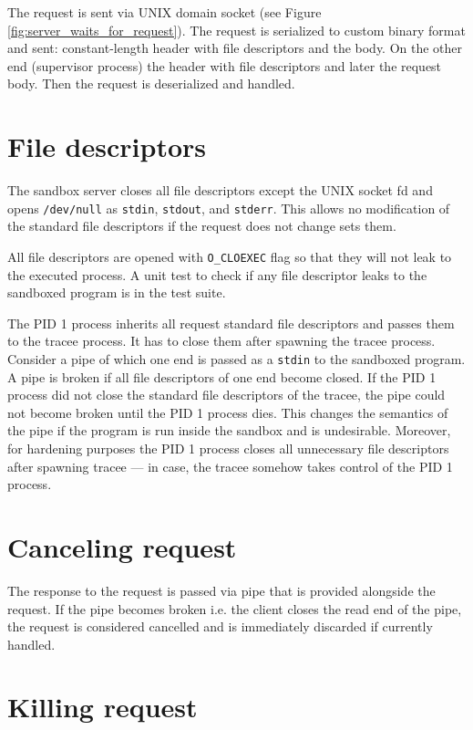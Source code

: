 \documentclass[en]{pracamgr}
\begin{document}
The request is sent via UNIX domain socket (see Figure \ref{fig:server_waits_for_request}). The request is serialized to custom binary format and sent: constant-length header with file descriptors and the body. On the other end (supervisor process) the header with file descriptors and later the request body. Then the request is deserialized and handled.

\section{File descriptors}

The sandbox server closes all file descriptors except the UNIX socket fd and opens \texttt{/dev/null} as \texttt{stdin}, \texttt{stdout}, and \texttt{stderr}. This allows no modification of the standard file descriptors if the request does not change sets them.

All file descriptors are opened with \texttt{O\_CLOEXEC} flag so that they will not leak to the executed process. A unit test to check if any file descriptor leaks to the sandboxed program is in the test suite.

The PID 1 process inherits all request standard file descriptors and passes them to the tracee process. It has to close them after spawning the tracee process. Consider a pipe of which one end is passed as a \texttt{stdin} to the sandboxed program. A pipe is broken if all file descriptors of one end become closed. If the PID 1 process did not close the standard file descriptors of the tracee, the pipe could not become broken until the PID 1 process dies. This changes the semantics of the pipe if the program is run inside the sandbox and is undesirable. Moreover, for hardening purposes the PID 1 process closes all unnecessary file descriptors after spawning tracee --- in case, the tracee somehow takes control of the PID 1 process.

\section{Canceling request}

The response to the request is passed via pipe that is provided alongside the request. If the pipe becomes broken i.e. the client closes the read end of the pipe, the request is considered cancelled and is immediately discarded if currently handled.

\section{Killing request}
\end{document}
